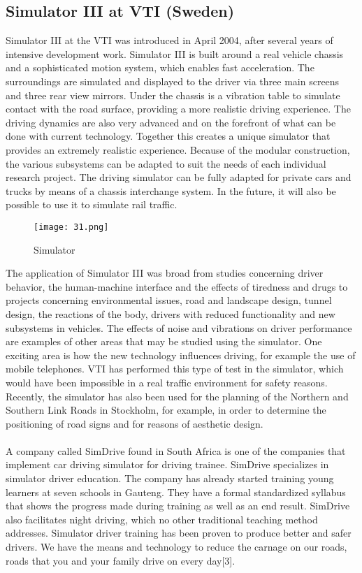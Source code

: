\documentclass[12pt,a4paper]{article}
\begin{document}
\begin{center}
\subsection{Simulator III at VTI (Sweden)}
Simulator III at the VTI was introduced in April 2004, after several years of intensive development work. Simulator III is built around a real vehicle chassis and a sophisticated motion system, which enables fast acceleration. The surroundings are simulated and displayed to the driver via three main screens and three rear view mirrors. Under the chassis is a vibration table to simulate contact with the road surface, providing a more realistic driving experience. The driving dynamics are also very advanced and on the forefront of what can be done with current technology. Together this creates a unique simulator that provides an extremely realistic experience. Because of the modular construction, the various subsystems can be adapted to suit the needs of each individual research project. The driving simulator can be fully adapted for private cars and trucks by means of a chassis interchange system. In the future, it will also be possible to use it to simulate rail traffic.
\begin{figure}[H]
	\centering 
	\texttt{[image: 31.png]}
	\caption{Simulator}	
\end{figure}
The application of Simulator III was broad from studies concerning driver behavior, the human-machine interface and the effects of tiredness and drugs to projects concerning environmental issues, road and landscape design, tunnel design, the reactions of the body, drivers with reduced functionality and new subsystems in vehicles. The effects of noise and vibrations on driver performance are examples of other areas that may be studied using the simulator. One exciting area is how the new technology influences driving, for example the use of mobile telephones. VTI has performed this type of test in the simulator, which would have been impossible in a real traffic environment for safety reasons. Recently, the simulator has also been used for the planning of the Northern and Southern Link Roads in Stockholm, for example, in order to determine the positioning of road signs and for reasons of aesthetic design.\\
\\

A company called SimDrive found in South Africa is one of the companies that implement car driving simulator for driving trainee. SimDrive specializes in simulator driver education. The company has already started training young learners at seven schools in Gauteng. They have a formal standardized syllabus that shows the progress made during training as well as an end result. SimDrive also facilitates night driving, which no other traditional teaching method addresses. Simulator driver training has been proven to produce better and safer drivers. We have the means and technology to reduce the carnage on our roads, roads that you and your family drive on every day[3].\\


\end{center}
\end{document}
